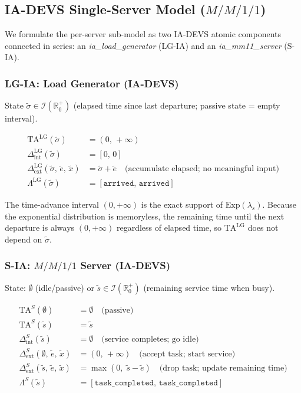 \subsection*{IA-DEVS Single-Server Model ($M/M/1/1$)}

We formulate the per-server sub-model as two IA-DEVS atomic components
connected in series: an \textit{ia\_load\_generator} (LG-IA) and an
\textit{ia\_mm11\_server} (S-IA).

\subsubsection*{LG-IA: Load Generator (IA-DEVS)}

State $\tilde\sigma \in \mathcal{I}(\mathbb{R}^+_0)$ (elapsed time since
last departure; passive state = empty interval).

\begin{align*}
  \mathrm{TA}^{\mathrm{LG}}(\tilde\sigma)
    &= (0,\,+\infty) \\
  \Delta^{\mathrm{LG}}_{\mathrm{int}}(\tilde\sigma)
    &= [0,\,0] \\
  \Delta^{\mathrm{LG}}_{\mathrm{ext}}(\tilde\sigma,\,\tilde e,\,\tilde x)
    &= \tilde\sigma + \tilde e
       \quad\text{(accumulate elapsed; no meaningful input)} \\
  \Lambda^{\mathrm{LG}}(\tilde\sigma)
    &= [\mathtt{arrived},\,\mathtt{arrived}]
\end{align*}

The time-advance interval $(0,+\infty)$ is the exact support of
$\mathrm{Exp}(\lambda_s)$.  Because the exponential distribution is
memoryless, the remaining time until the next departure is always
$(0,+\infty)$ regardless of elapsed time, so $\mathrm{TA}^{\mathrm{LG}}$
does not depend on $\tilde\sigma$.

\subsubsection*{S-IA: $M/M/1/1$ Server (IA-DEVS)}

State: $\emptyset$ (idle/passive) or $\tilde s \in \mathcal{I}(\mathbb{R}^+_0)$
(remaining service time when busy).

\begin{align*}
  \mathrm{TA}^S(\emptyset)
    &= \emptyset \quad\text{(passive)} \\
  \mathrm{TA}^S(\tilde s)
    &= \tilde s \\
  \Delta^S_{\mathrm{int}}(\tilde s)
    &= \emptyset \quad\text{(service completes; go idle)} \\
  \Delta^S_{\mathrm{ext}}(\emptyset,\,\tilde e,\,\tilde x)
    &= (0,\,+\infty)
       \quad\text{(accept task; start service)} \\
  \Delta^S_{\mathrm{ext}}(\tilde s,\,\tilde e,\,\tilde x)
    &= \max(0,\; \tilde s - \tilde e)
       \quad\text{(drop task; update remaining time)} \\
  \Lambda^S(\tilde s)
    &= [\mathtt{task\_completed},\,\mathtt{task\_completed}]
\end{align*}

